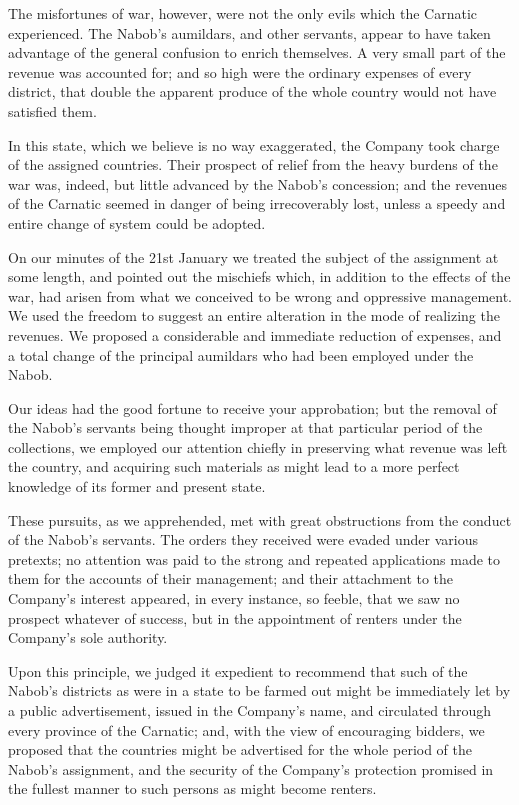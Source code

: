 The misfortunes of war, however, were not the only evils which the Carnatic experienced. The Nabob's aumildars, and other servants, appear to have taken advantage of the general confusion to enrich themselves. A very small part of the revenue was accounted for; and so high were the ordinary expenses of every district, that double the apparent produce of the whole country would not have satisfied them.

In this state, which we believe is no way exaggerated, the Company took charge of the assigned countries. Their prospect of relief from the heavy burdens of the war was, indeed, but little advanced by the Nabob's concession; and the revenues of the Carnatic seemed in danger of being irrecoverably lost, unless a speedy and entire change of system could be adopted.

On our minutes of the 21st January we treated the subject of the assignment at some length, and pointed out the mischiefs which, in addition to the effects of the war, had arisen from what we conceived to be wrong and oppressive management. We used the freedom to suggest an entire alteration in the mode of realizing the revenues. We proposed a considerable and immediate reduction of expenses, and a total change of the principal aumildars who had been employed under the Nabob.

Our ideas had the good fortune to receive your approbation; but the removal of the Nabob's servants being thought improper at that particular period of the collections, we employed our attention chiefly in preserving what revenue was left the country, and acquiring such materials as might lead to a more perfect knowledge of its former and present state.

These pursuits, as we apprehended, met with great obstructions from the conduct of the Nabob's servants. The orders they received were evaded under various pretexts; no attention was paid to the strong and repeated applications made to them for the accounts of their management; and their attachment to the Company's interest appeared, in every instance, so feeble, that we saw no prospect whatever of success, but in the appointment of renters under the Company's sole authority.

Upon this principle, we judged it expedient to recommend that such of the Nabob's districts as were in a state to be farmed out might be immediately let by a public advertisement, issued in the Company's name, and circulated through every province of the Carnatic; and, with the view of encouraging bidders, we proposed that the countries might be advertised for the whole period of the Nabob's assignment, and the security of the Company's protection promised in the fullest manner to such persons as might become renters.

